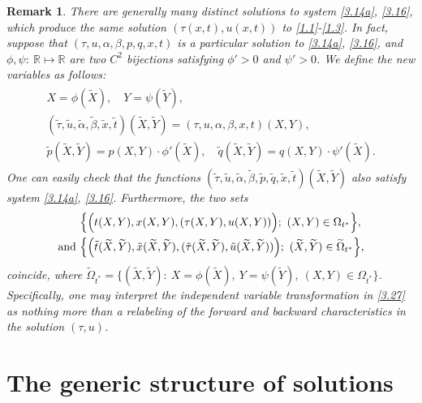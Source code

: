 \documentclass[11pt,reqno]{article}
\newtheorem{rem}{Remark}
\numberwithin{equation}{section}
\begin{document}
\begin{rem}\label{r4}
There are generally many distinct solutions to system \eqref{3.14a}, \eqref{3.16}, which produce the same solution $(\tau(x,t),u(x,t))$ to \eqref{1.1}-\eqref{1.3}. In fact, suppose that $(\tau, u, \alpha, \beta, p, q, x, t)$ is a particular solution to \eqref{3.14a}, \eqref{3.16}, and $\phi, \psi:\ \mathbb{R}\mapsto \mathbb{R}$ are two $C^2$ bijections satisfying $\phi'>0$ and $\psi'>0$. We define the new variables as follows:
\begin{align}\label{3.27}
\begin{split}
X=\phi(\widetilde{X}),\quad Y=\psi(\widetilde{Y}), \\
(\tilde{\tau}, \tilde{u}, \tilde{\alpha}, \tilde{\beta}, \tilde{x}, \tilde{t})(\widetilde{X}, \widetilde{Y}) =(\tau, u, \alpha, \beta, x, t)(X,Y), \\
\tilde{p}(\widetilde{X}, \widetilde{Y})=p(X,Y)\cdot \phi'(\widetilde{X}),\quad \tilde{q}(\widetilde{X}, \widetilde{Y})=q(X,Y)\cdot \psi'(\widetilde{X}).
\end{split}
\end{align}
One can easily check that the functions $(\tilde{\tau}, \tilde{u},  \tilde{\alpha}, \tilde{\beta}, \tilde{p}, \tilde{q}, \tilde{x}, \tilde{t})(\widetilde{X}, \widetilde{Y})$ also satisfy system \eqref{3.14a}, \eqref{3.16}. Furthermore, the two sets
\begin{align*}
\begin{split}
&\Big\{\Big(t(X,Y), x(X,Y),(\tau(X,Y), u(X,Y))\Big);\ (X,Y)\in \Omega_{t^*}\Big\}, \\
{\rm and}\ &\Big\{\Big(\tilde{t}(\widetilde{X}, \widetilde{Y}), \tilde{x}(\widetilde{X}, \widetilde{Y}), (\tilde{\tau}(\widetilde{X}, \widetilde{Y}), \tilde{u}(\widetilde{X}, \widetilde{Y}))\Big);\ (\widetilde{X}, \widetilde{Y})\in \widetilde{\Omega}_{t^*}\Big\},
\end{split}
\end{align*}
coincide, where $\widetilde{\Omega}_{t^*}=\{(\widetilde{X}, \widetilde{Y}):\ X=\phi(\widetilde{X}),\ Y=\psi(\widetilde{Y}),\ (X,Y)\in\Omega_{t^*}\}$. Specifically,
one may interpret the independent variable transformation in \eqref{3.27} as nothing more than a relabeling of the forward and backward characteristics in the solution $(\tau, u)$.
\end{rem}


\section{The generic structure of solutions}\label{S4}
\end{document}
